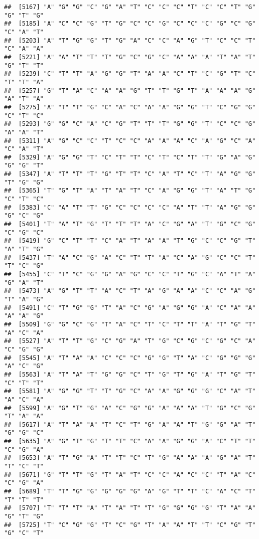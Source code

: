 \documentclass[
]{article}
\begin{document}
\begin{verbatim}
##  [5167] "A" "G" "G" "C" "G" "A" "T" "C" "C" "C" "T" "C" "C" "T" "G" "G" "T" "G"
##  [5185] "A" "C" "C" "G" "T" "G" "C" "C" "G" "C" "C" "C" "G" "C" "G" "C" "A" "T"
##  [5203] "A" "T" "G" "G" "T" "G" "A" "C" "C" "A" "G" "T" "C" "C" "T" "C" "A" "A"
##  [5221] "A" "A" "T" "T" "T" "G" "C" "G" "C" "A" "A" "A" "T" "A" "T" "G" "T" "T"
##  [5239] "C" "T" "T" "A" "G" "G" "T" "A" "A" "C" "T" "C" "G" "T" "C" "T" "T" "A"
##  [5257] "G" "T" "A" "C" "A" "A" "G" "T" "T" "G" "T" "A" "A" "A" "G" "A" "T" "A"
##  [5275] "A" "T" "T" "G" "C" "A" "C" "A" "A" "G" "G" "T" "C" "G" "G" "C" "T" "C"
##  [5293] "G" "G" "C" "A" "C" "G" "T" "T" "T" "G" "G" "T" "C" "C" "G" "A" "A" "T"
##  [5311] "A" "G" "C" "C" "T" "C" "C" "A" "A" "A" "C" "A" "G" "C" "A" "C" "A" "T"
##  [5329] "A" "G" "G" "T" "C" "T" "T" "C" "T" "C" "T" "T" "G" "A" "G" "G" "G" "T"
##  [5347] "A" "T" "T" "T" "G" "T" "T" "C" "A" "T" "C" "T" "A" "G" "G" "T" "G" "G"
##  [5365] "T" "G" "T" "A" "T" "A" "T" "C" "A" "G" "G" "T" "A" "T" "G" "C" "T" "C"
##  [5383] "C" "A" "T" "T" "G" "C" "C" "C" "C" "A" "T" "T" "A" "G" "G" "G" "C" "G"
##  [5401] "T" "A" "T" "G" "T" "T" "T" "A" "C" "G" "A" "T" "G" "C" "G" "C" "G" "C"
##  [5419] "G" "C" "T" "T" "C" "A" "T" "A" "A" "T" "G" "C" "C" "G" "T" "A" "T" "G"
##  [5437] "T" "A" "C" "G" "A" "C" "T" "T" "A" "C" "A" "G" "C" "C" "T" "T" "C" "G"
##  [5455] "C" "T" "C" "G" "G" "A" "G" "C" "C" "T" "G" "C" "A" "T" "A" "G" "A" "T"
##  [5473] "A" "G" "T" "T" "A" "C" "T" "A" "G" "A" "A" "C" "C" "A" "G" "T" "A" "G"
##  [5491] "C" "T" "G" "G" "T" "A" "C" "G" "A" "G" "G" "A" "C" "A" "A" "A" "A" "G"
##  [5509] "G" "G" "C" "G" "T" "A" "C" "T" "C" "T" "T" "A" "T" "G" "T" "A" "C" "A"
##  [5527] "A" "T" "T" "G" "C" "G" "A" "T" "G" "C" "G" "C" "G" "C" "A" "C" "G" "G"
##  [5545] "A" "T" "A" "A" "C" "C" "C" "G" "G" "T" "A" "C" "G" "G" "G" "A" "C" "G"
##  [5563] "A" "T" "A" "T" "G" "G" "C" "T" "G" "T" "G" "A" "T" "G" "T" "C" "T" "T"
##  [5581] "A" "G" "G" "T" "T" "G" "C" "A" "A" "G" "G" "G" "C" "A" "T" "A" "C" "A"
##  [5599] "A" "G" "T" "G" "A" "C" "G" "G" "A" "A" "A" "T" "G" "C" "G" "T" "A" "A"
##  [5617] "A" "T" "A" "A" "T" "C" "T" "G" "A" "A" "T" "G" "G" "A" "T" "G" "G" "C"
##  [5635] "A" "G" "T" "G" "T" "T" "C" "A" "A" "G" "G" "A" "C" "T" "T" "C" "G" "A"
##  [5653] "A" "T" "G" "A" "T" "T" "C" "T" "G" "A" "A" "A" "G" "A" "T" "T" "C" "T"
##  [5671] "G" "T" "T" "G" "T" "A" "T" "C" "C" "A" "C" "C" "T" "A" "C" "C" "G" "A"
##  [5689] "T" "T" "G" "G" "G" "G" "G" "A" "G" "T" "T" "C" "A" "C" "T" "T" "T" "T"
##  [5707] "T" "T" "T" "A" "T" "A" "T" "T" "G" "G" "G" "G" "T" "A" "A" "G" "T" "G"
##  [5725] "T" "C" "G" "G" "T" "C" "G" "T" "A" "A" "T" "T" "C" "G" "T" "G" "C" "T"

\end{verbatim}
\end{document}
